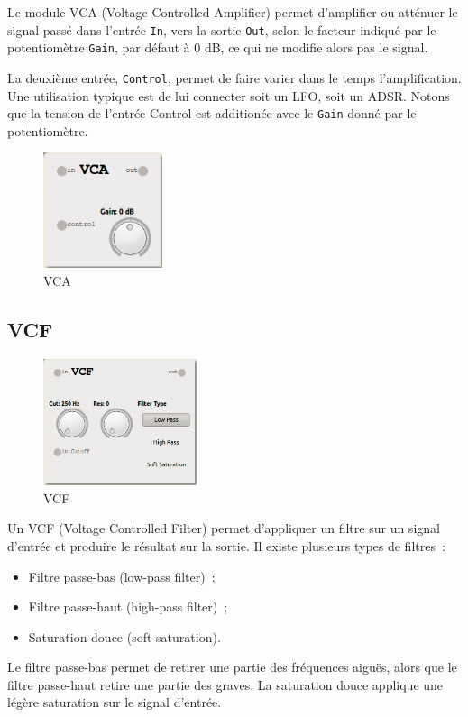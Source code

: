 \documentclass[a4paper,oneside,frenchb,10pt]{article}
\begin{document}
\begin{multicols}{2}
Le module VCA (Voltage Controlled Amplifier) permet d'amplifier ou
atténuer le signal passé dans l'entrée \verb!In!, vers la sortie
\verb!Out!, selon le facteur indiqué par le potentiomètre \verb!Gain!,
par défaut à 0 dB, ce qui ne modifie alors pas le signal.

La deuxième entrée, \verb!Control!, permet de faire varier dans le temps
l'amplification. Une utilisation typique est de lui connecter soit un
LFO, soit un ADSR. Notons que la tension de l'entrée Control est
additionée avec le \verb!Gain! donné par le potentiomètre.

\begin{figure}[H]
\centering
\includegraphics[width=3.5cm]{../img/png/vca.png}
\caption{VCA}
\end{figure}
\end{multicols}

\newpage

\subsection{VCF}

\begin{multicols}{2}
\begin{figure}[H]
\centering
\includegraphics[width=4.5cm]{../img/png/vcf.png}
\caption{VCF}
\end{figure}

Un VCF (Voltage Controlled Filter) permet d'appliquer un filtre sur un
signal d'entrée et produire le résultat sur la sortie. Il existe
plusieurs types de filtres~:

\begin{itemize}
\item
  Filtre passe-bas (low-pass filter)~;
\item
  Filtre passe-haut (high-pass filter)~;
\item
  Saturation douce (soft saturation).
\end{itemize}

Le filtre passe-bas permet de retirer une partie des fréquences aiguës,
alors que le filtre passe-haut retire une partie des graves. La
saturation douce applique une légère saturation sur le signal d'entrée.
\end{multicols}
\end{document}
